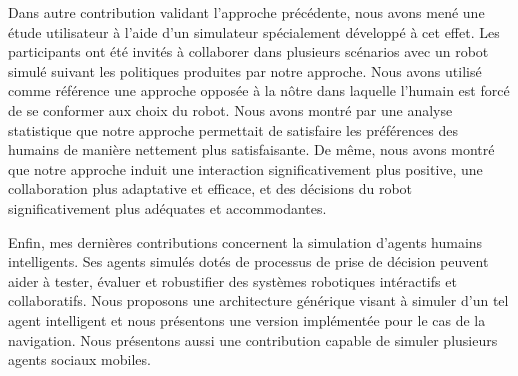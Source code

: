 Dans autre contribution validant l'approche précédente, nous avons mené une étude utilisateur à l'aide d'un simulateur spécialement développé à cet effet. Les participants ont été invités à collaborer dans plusieurs scénarios avec un robot simulé suivant les politiques produites par notre approche. Nous avons utilisé comme référence une approche opposée à la nôtre dans laquelle l'humain est forcé de se conformer aux choix du robot. Nous avons montré par une analyse statistique que notre approche permettait de satisfaire les préférences des humains de manière nettement plus satisfaisante. De même, nous avons montré que notre approche induit une interaction significativement plus positive, une collaboration plus adaptative et efficace, et des décisions du robot significativement plus adéquates et accommodantes.

Enfin, mes dernières contributions concernent la simulation d'agents humains intelligents. Ses agents simulés dotés de processus de prise de décision peuvent aider à tester, évaluer et robustifier des systèmes robotiques intéractifs et collaboratifs. Nous proposons une architecture générique visant à simuler d'un tel agent intelligent et nous présentons une version implémentée pour le cas de la navigation. Nous présentons aussi une contribution capable de simuler plusieurs agents sociaux mobiles.